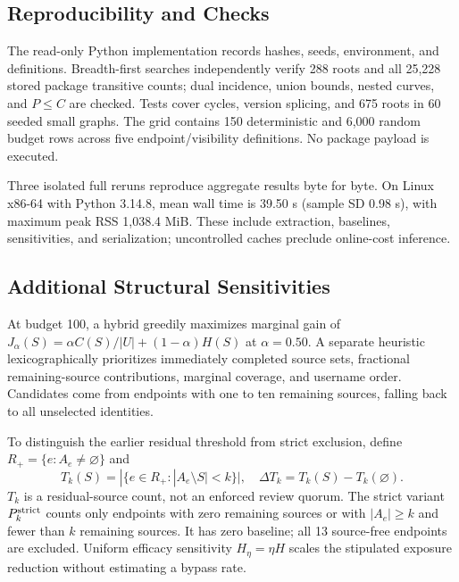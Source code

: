 \subsection{Reproducibility and Checks}
The read-only Python implementation records hashes, seeds, environment, and definitions. Breadth-first searches independently verify 288 roots and all 25,228 stored package transitive counts; dual incidence, union bounds, nested curves, and $P\le C$ are checked. Tests cover cycles, version splicing, and 675 roots in 60 seeded small graphs. The grid contains 150 deterministic and 6,000 random budget rows across five endpoint/visibility definitions. No package payload is executed.

Three isolated full reruns reproduce aggregate results byte for byte. On Linux x86-64 with Python 3.14.8, mean wall time is 39.50 s (sample SD 0.98 s), with maximum peak RSS 1,038.4 MiB. These include extraction, baselines, sensitivities, and serialization; uncontrolled caches preclude online-cost inference.


\subsection{Additional Structural Sensitivities}
At budget 100, a hybrid greedily maximizes marginal gain of $J_\alpha(S)=\alpha C(S)/|U|+(1-\alpha)H(S)$ at $\alpha=0.50$. A separate heuristic lexicographically prioritizes immediately completed source sets, fractional remaining-source contributions, marginal coverage, and username order. Candidates come from endpoints with one to ten remaining sources, falling back to all unselected identities.

To distinguish the earlier residual threshold from strict exclusion, define $R_+=\{e:A_e\ne\varnothing\}$ and
\begin{equation}
 T_k(S)=|\{e\in R_+:|A_e\setminus S|<k\}|,\quad
 \Delta T_k=T_k(S)-T_k(\varnothing).
\end{equation}
$T_k$ is a residual-source count, not an enforced review quorum. The strict variant $P_k^{\rm strict}$ counts only endpoints with zero remaining sources or with $|A_e|\ge k$ and fewer than $k$ remaining sources. It has zero baseline; all 13 source-free endpoints are excluded. Uniform efficacy sensitivity $H_\eta=\eta H$ scales the stipulated exposure reduction without estimating a bypass rate.
